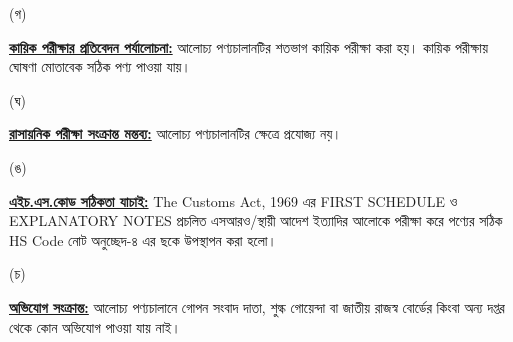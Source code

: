 \documentclass[12pt]{article}
\begin{document}
\begin{minipage}[t]{0.05\linewidth}
\hspace{1em}
\end{minipage}
\begin{minipage}[t]{0.05\linewidth}
(গ)
\end{minipage}
\begin{minipage}[t]{0.90\linewidth}
\underline{\textbf{কায়িক পরীক্ষার প্রতিবেদন পর্যালোচনা:}}
আলোচ্য পণ্যচালানটির শতভাগ কায়িক পরীক্ষা করা হয়।
কায়িক পরীক্ষায় ঘোষণা মোতাবেক সঠিক পণ্য পাওয়া যায়।
\\
\end{minipage}
\begin{minipage}[t]{0.05\linewidth}
\hspace{1em}
\end{minipage}
\begin{minipage}[t]{0.05\linewidth}
(ঘ)
\end{minipage}
\begin{minipage}[t]{0.90\linewidth}
\underline{\textbf{রাসায়নিক পরীক্ষা সংক্রান্ত মন্তব্য:}}
আলোচ্য পণ্যচালানটির ক্ষেত্রে প্রযোজ্য নয়।
\\
\end{minipage}
\begin{minipage}[t]{0.05\linewidth}
\hspace{1em}
\end{minipage}
\begin{minipage}[t]{0.05\linewidth}
(ঙ)
\end{minipage}
\begin{minipage}[t]{0.90\linewidth}
\underline{\textbf{এইচ.এস.কোড সঠিকতা যাচাই:}}
The Customs Act, 1969 এর FIRST SCHEDULE ও
EXPLANATORY NOTES প্রচলিত এসআরও/স্থায়ী আদেশ ইত্যাদির আলোকে পরীক্ষা করে পণ্যের সঠিক HS Code নোট অনুচ্ছেদ-৪
এর ছকে উপস্থাপন করা হলো।
\\
\end{minipage}
\begin{minipage}[t]{0.05\linewidth}
\hspace{1em}
\end{minipage}
\begin{minipage}[t]{0.05\linewidth}
(চ)
\end{minipage}
\begin{minipage}[t]{0.90\linewidth}
\underline{\textbf{অভিযোগ সংক্রান্ত:}} আলোচ্য পণ্যচালানে
গোপন সংবাদ দাতা, শুল্ক গোয়েন্দা বা
জাতীয় রাজস্ব বোর্ডের কিংবা অন্য দপ্তর থেকে
কোন অভিযোগ পাওয়া যায় নাই।
\\
\end{minipage}
\end{document}
